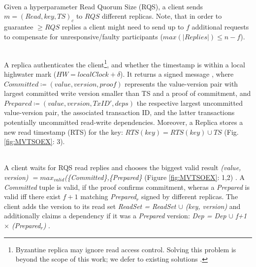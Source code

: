 \\
Given a hyperparameter Read Quorum Size (RQS), a client sends $m = (Read, key, TS)_c$  to $RQS$ different replicas. Note, that in order to guarantee $\geq RQS$ replies a client might need to send up to $f$ additional requests to compensate for unresponsive/faulty participants ($max(|Replies|) \leq n-f$). 

\\
A replica authenticates the client\footnote{Byzantine replica may ignore read access control. Solving this problem is beyond the scope of this work; we defer to existing solutions \cite{basu2019efficient}.}, and whether the timestamp is within a local highwater mark ($HW = localClock + \delta$). It returns a signed message , where $Committed \coloneqq (value, version, proof)$ represents the value-version pair with largest committed write version smaller than TS and a proof of commitment,  and $Prepared \coloneqq (value, version, TxID', deps)$ the respective largest uncommitted value-version pair, the associated transaction ID, and the latter transactions potentially uncommitted read-write dependencies. Moreover, a Replica stores a new read timestamp (RTS) for the key: $RTS(key) = RTS(key) \cup TS$ (Fig. \ref{fig:MVTSOEX}: 3). 

\\
A client waits for RQS read replies and chooses the biggest valid result \textit{(value, version) $= max_{valid}$(\{Committed\},\{Prepared\}} (Figure \ref{fig:MVTSOEX}: 1,2) . A \textit{Committed} tuple is valid, if the proof confirms commitment, wheras a \textit{Prepared} is valid iff there exist $f+1$ matching \textit{Prepared$_r$} signed by different replicas. The client adds the version to its read set \textit{ReadSet = ReadSet $\cup$ (key, version)} and additionally claims a dependency if it was a \textit{Prepared} version: \textit{Dep = Dep $\cup$ f+1 $\times$ (Prepared$_r$)} . 

